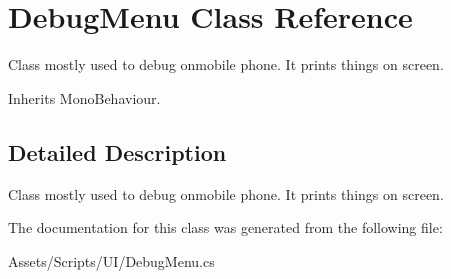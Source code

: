 \hypertarget{class_debug_menu}{\section{Debug\-Menu Class Reference}
\label{class_debug_menu}
}


Class mostly used to debug onmobile phone. It prints things on screen. 




Inherits Mono\-Behaviour.



\subsection{Detailed Description}
Class mostly used to debug onmobile phone. It prints things on screen.



The documentation for this class was generated from the following file\-:\begin{DoxyCompactItemize}
\item 
Assets/\-Scripts/\-U\-I/Debug\-Menu.\-cs\end{DoxyCompactItemize}
